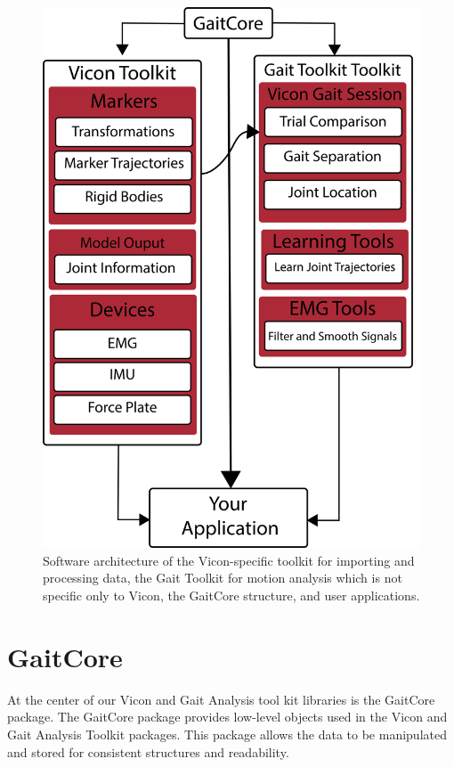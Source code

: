 \begin{figure}[hbt]
    \centering
    \includegraphics[scale=0.15]{images/software/software.png}
    \caption[Software Architecture]{Software architecture of the Vicon-specific toolkit for importing and processing data, the Gait Toolkit for motion analysis which is not specific only to Vicon, the GaitCore structure, and user applications.}
    \label{fig:software}
\end{figure}


\section{GaitCore}
At the center of our Vicon and Gait Analysis tool kit libraries is the GaitCore package. The GaitCore package provides low-level objects used in the Vicon and Gait Analysis Toolkit packages. This package allows the data to be manipulated and stored for consistent structures and readability.

